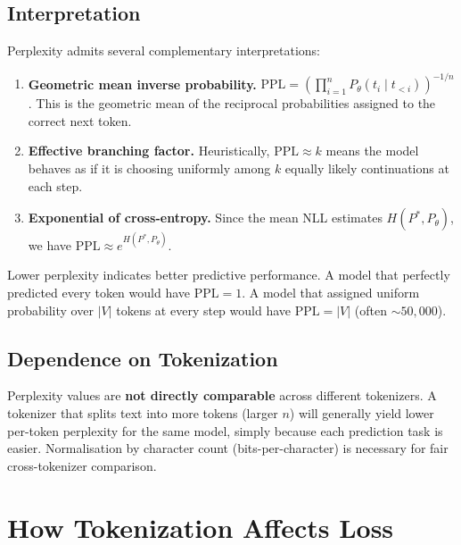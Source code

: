 \documentclass[11pt,a4paper]{article}
\theoremstyle{definition}
\theoremstyle{plain}
\newcommand{\PPL}{\mathrm{PPL}}
\newcommand{\Hc}{H}
\begin{document}
\subsection{Interpretation}

Perplexity admits several complementary interpretations:

\begin{enumerate}[leftmargin=2em, itemsep=2pt]
  \item \textbf{Geometric mean inverse probability.}
        $\PPL = \left(\prod_{i=1}^n P_\theta(t_i \mid t_{<i})\right)^{-1/n}$.
        This is the geometric mean of the reciprocal probabilities assigned
        to the correct next token.
  \item \textbf{Effective branching factor.}
        Heuristically, $\PPL \approx k$ means the model behaves as if it is
        choosing uniformly among $k$ equally likely continuations at each step.
  \item \textbf{Exponential of cross-entropy.}
        Since the mean NLL estimates $\Hc(P^*, P_\theta)$, we have
        $\PPL \approx e^{\Hc(P^*, P_\theta)}$.
\end{enumerate}

Lower perplexity indicates better predictive performance.
A model that perfectly predicted every token would have $\PPL = 1$.
A model that assigned uniform probability over $|V|$ tokens at every step would
have $\PPL = |V|$ (often $\sim 50{,}000$).

\subsection{Dependence on Tokenization}

\begin{cautionbox}
Perplexity values are \textbf{not directly comparable} across different tokenizers.
A tokenizer that splits text into more tokens (larger $n$) will generally yield
lower per-token perplexity for the same model, simply because each prediction
task is easier.
Normalisation by character count (bits-per-character) is necessary for
fair cross-tokenizer comparison.
\end{cautionbox}

\section{How Tokenization Affects Loss}
\end{document}
